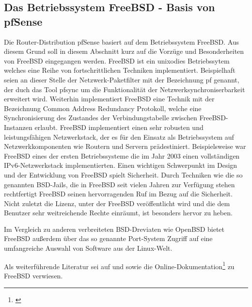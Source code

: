 \documentclass[a4paper,12pt]{scrartcl}
\begin{document}
\subsection{Das Betriebssystem FreeBSD - Basis von pfSense}
Die Router-Distribution pfSense basiert auf dem Betriebssystem FreeBSD. Aus diesem Grund soll in diesem Abschnitt kurz auf die Vorz\"uge und Besonderheiten von
FreeBSD eingegangen werden. FreeBSD ist ein unixodies Betriebssytem welches eine Reihe von fortschrittlichen Techniken implementiert. Beispielhaft seien an
dieser Stelle der Netzwerk-Paketfilter mit der Bezeichnung pf genannt, der duch das Tool pfsync um die Funktionalit\"at der Netzwerksynchroniserbarkeit
erweitert wird. Weiterhin implementiert FreeBSD eine Technik mit der Bezeichnung Common Address Redundancy Protokoll, welche eine Synchronisierung des Zustandes
der Verbindungstabelle zwischen FreeBSD-Instanzen erlaubt. FreeBSD implementiert einen sehr robusten und leistungsf\"ahigen Netzwerkstack, der es f\"ur den
Einsatz als Betriebssystem auf Netzwerkkomponenten wie Routern und Servern pr\"adestiniert. Beispielsweise war FreeBSD eines der ersten Betriebssysteme die
im Jahr 2003 einen vollst\"andigen IPv6-Netzwerkstack implementierten. Einen wichtigen Schwerpunkt im Design und der Entwicklung von FreeBSD spielt Sicherheit.
Durch Techniken wie die so genannten BSD-Jails, die in FreeBSD seit vielen Jahren zur Verf\"ugung stehen rechtfertigt FreeBSD seinen hervorragenden Ruf im Bezug
auf die Sicherheit. Nicht zuletzt die Lizenz, unter der FreeBSD ver\"offentlicht wird und die dem Benutzer sehr weitreichende Rechte einr\"aumt, ist besonders
hervor zu heben.

Im Vergleich zu anderen verbreiteten BSD-Dreviaten wie OpenBSD bietet FreeBSD au\ss{}erdem \"uber das so genannte Port-System Zugriff auf eine umfangreiche
Auswahl von Software aus der Linux-Welt. 

Als weiterf\"uhrende Literatur sei auf \cite{buch_bsdultguide} und \cite{buch_bookofpf} sowie die Online-Dokumentation\footnote{\cite{FreeBSDDoc}} zu FreeBSD
verwiesen.
%
%
\end{document}
